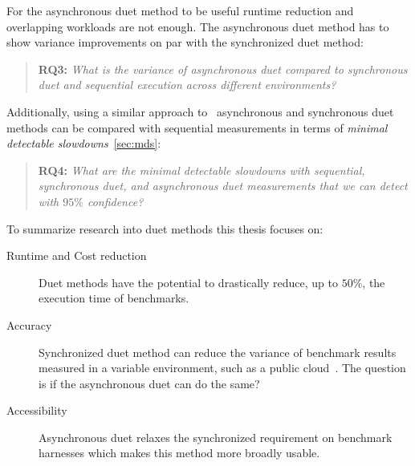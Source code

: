 
For the asynchronous duet method to be useful runtime reduction and overlapping workloads are not enough.
The asynchronous duet method has to show variance improvements on par with the synchronized duet method:

\begin{quote}
	\textbf{RQ3:} \emph{What is the variance of asynchronous duet compared to synchronous duet and sequential execution across different environments?}
\end{quote}

Additionally, using a similar approach to~\citet{laaber2019software} asynchronous and synchronous duet methods can be compared with sequential measurements in terms of \emph{minimal detectable slowdowns}~\cref{sec:mds}:

\begin{quote}
	\textbf{RQ4:} \emph{What are the minimal detectable slowdowns with sequential, synchronous duet, and asynchronous duet measurements that we can detect with $95\%$ confidence?}
\end{quote}

To summarize research into duet methods this thesis focuses on:
\begin{description}
	\item[Runtime and Cost reduction] Duet methods have the potential to drastically reduce, up to $50\%$, the execution time of benchmarks.
	\item[Accuracy] Synchronized duet method can reduce the variance of benchmark results measured in a variable environment, such as a public cloud~\citet{bulej2020duet}. The question is if the asynchronous duet can do the same?
	\item[Accessibility] Asynchronous duet relaxes the synchronized requirement on benchmark harnesses which makes this method more broadly usable.
\end{description}
